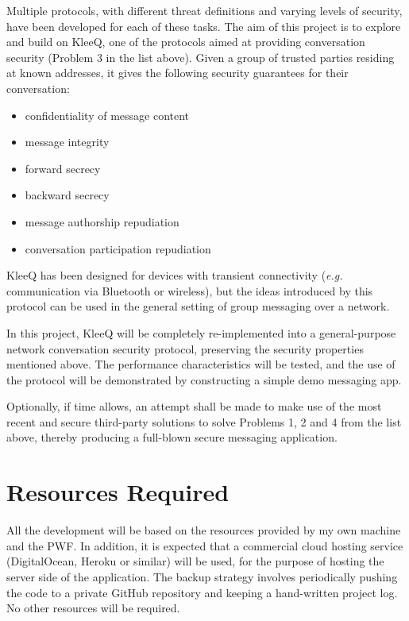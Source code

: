 \documentclass[a4paper, twoside, 12pt]{report}
\begin{document}
\begin{appendices}
\vspace{\baselineskip}
\noindent
Multiple protocols, with different threat definitions and varying levels of security, have been developed for each of these tasks. The aim of this project is to explore and build on KleeQ, one of the protocols aimed at providing conversation security (Problem 3 in the list above). Given a group of trusted parties residing at known addresses, it gives the following security guarantees for their conversation:
\begin{itemize}
    \item confidentiality of message content
    \item message integrity
    \item forward secrecy
    \item backward secrecy
    \item message authorship repudiation
    \item conversation participation repudiation
\end{itemize}
KleeQ has been designed for devices with transient connectivity (\textit{e.g.} communication via Bluetooth or wireless), but the ideas introduced by this protocol can be used in the general setting of group messaging over a network.

\vspace{\baselineskip}
\noindent
In this project, KleeQ will be completely re-implemented into a general-purpose network conversation security protocol, preserving the security properties mentioned above. The performance characteristics will be tested, and the use of the protocol will be demonstrated by constructing a simple demo messaging app.

\vspace{\baselineskip}
\noindent
Optionally, if time allows, an attempt shall be made to make use of the most recent and secure third-party solutions to solve Problems 1, 2 and 4 from the list above, thereby producing a full-blown secure messaging application.


\section{Resources Required}
All the development will be based on the resources provided by my own machine and the PWF. In addition, it is expected that a commercial cloud hosting service (DigitalOcean, Heroku or similar) will be used, for the purpose of hosting the server side of the application. The backup strategy involves periodically pushing the code to a private GitHub repository and keeping a hand-written project log. No other resources will be required.



\end{appendices}
\end{document}
